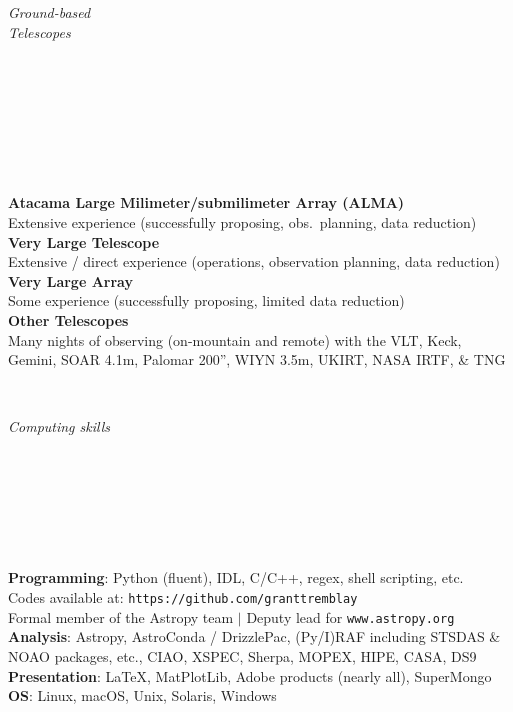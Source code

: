 \documentclass[11pt]{article}
\begin{document}
\hspace{2.5mm} \parbox{1.5in}{\textit{Ground-based \\ Telescopes \\\\\\\\\\\\\\\\ }} \parbox{5.15in}{
\textbf{Atacama Large Milimeter/submilimeter Array (ALMA)}\\
Extensive experience (successfully proposing, obs.~planning, data reduction)\\
\textbf{Very Large Telescope}\\
Extensive / direct experience (operations, observation planning, data reduction)\\
\textbf{Very Large Array}\\
Some experience (successfully proposing, limited data reduction)\\
\textbf{Other Telescopes}\\
Many nights of observing (on-mountain and remote) with the VLT, Keck, Gemini, SOAR 4.1m, Palomar 200'', WIYN 3.5m, UKIRT, NASA IRTF, \& TNG\\
}\\


\hspace{2.5mm} \parbox{1.5in}{\textit{Computing skills \\\\\\\\\\\\\\}}
\parbox{5.15in}{
\textbf{Programming}: Python (fluent), IDL, C/C++, regex, shell scripting, etc. \\ Codes available at: {\small \texttt{https://github.com/granttremblay}}\\
Formal member of the Astropy team $|$ Deputy lead for \texttt{www.astropy.org} \\
\textbf{Analysis}: Astropy, AstroConda / DrizzlePac, (Py/I)RAF including STSDAS \& NOAO packages, etc., CIAO, XSPEC, Sherpa, MOPEX, HIPE, CASA, DS9 \\
\textbf{Presentation}:  \LaTeX, MatPlotLib, Adobe products (nearly all), SuperMongo \\
\textbf{OS}: Linux, macOS, Unix, Solaris, Windows\\
}\\
\end{document}

